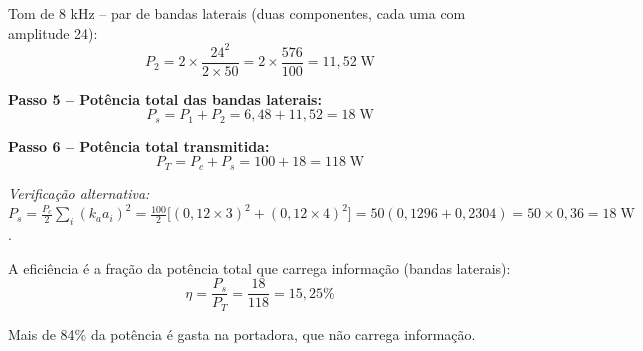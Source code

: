 \documentclass[11pt,a4paper]{article}
\begin{document}
\begin{resolucao}
Tom de 8 kHz -- par de bandas laterais (duas componentes, cada uma com amplitude 24):
\[
  P_2 = 2 \times \frac{24^2}{2 \times 50} = 2 \times \frac{576}{100} = 11{,}52\;\text{W}
\]

\textbf{Passo 5 -- Potência total das bandas laterais:}
\[
  P_s = P_1 + P_2 = 6{,}48 + 11{,}52 = \boxed{18\;\text{W}}
\]

\textbf{Passo 6 -- Potência total transmitida:}
\[
  P_T = P_c + P_s = 100 + 18 = \boxed{118\;\text{W}}
\]

\textit{Verificação alternativa:} $P_s = \frac{P_c}{2}\sum_i (k_a a_i)^2 = \frac{100}{2}\big[(0{,}12 \times 3)^2 + (0{,}12 \times 4)^2\big] = 50(0{,}1296 + 0{,}2304) = 50 \times 0{,}36 = 18\;\text{W}$. \checkmark
\end{resolucao}

\begin{resolucao}

A eficiência é a fração da potência total que carrega informação (bandas laterais):
\[
  \eta = \frac{P_s}{P_T} = \frac{18}{118} = \boxed{15{,}25\%}
\]

Mais de 84\% da potência é gasta na portadora, que não carrega informação.
\end{resolucao}
\end{document}
